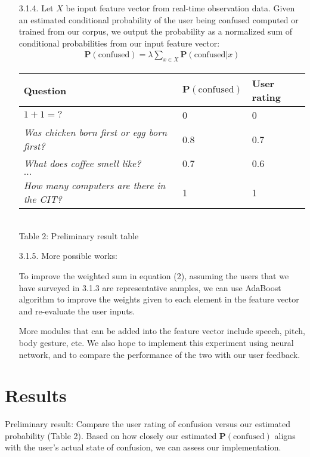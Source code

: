 \documentclass[12pt,letterpaper]{article}
\begin{document}
\begin{itemize}
\item[3.1.4.]  Let $X$ be input feature vector from real-time observation data. Given an estimated conditional probability of the user being confused computed or trained from our corpus, we output the probability as a normalized sum of conditional probabilities from our input feature vector:
\begin{align}
\mathbf{P}(\text{confused}) = \lambda \sum_{x \in X} \mathbf{P}(\text{confused}|x) 
\end{align}

\begin{center}
\begin{tabular}{ p{8cm} | p{2cm} | p{2cm}}
\bf{Question} & $\mathbf{P}(\text{confused})$ & User rating \\ \hline
$1+1=?$ & 0 & 0\\
\emph{Was chicken born first or egg born first?} & 0.8 & 0.7\\
\emph{What does coffee smell like?} & 0.7 & 0.6\\
$\ldots$ & &\\
\emph{How many computers are there in the CIT?} & 1 & 1\\
\end{tabular}
\\\vspace{7 mm} Table 2: Preliminary result table
\end{center}


\item[3.1.5.]  More possible works:

To improve the weighted sum in equation (2), assuming the users that we have surveyed in 3.1.3 are representative samples, we can use AdaBoost algorithm to improve the weights given to each element in the feature vector and re-evaluate the user inputs. 

More modules that can be added into the feature vector include speech, pitch, body gesture, etc. We also hope to implement this experiment using neural network, and to compare the performance of the two with our user feedback. 
\end{itemize}

\section{Results}
Preliminary result: Compare the user rating of confusion versus our estimated probability (Table 2). Based on how closely our estimated $\mathbf{P}(\text{confused})$ aligns with the user's actual state of confusion, we can assess our implementation. 
\end{document}
